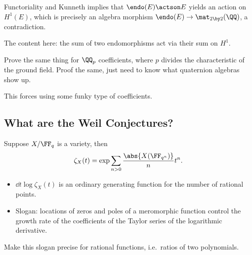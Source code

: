 \begin{exercise}

Functoriality and Kunneth implies that \(\endo(E)\actson E\) yields an
action on \(H^1(E)\), which is precisely an algebra morphism
\(\endo(E) \to \mat_{2\by 2}(\QQ)\), a contradiction.

The content here: the sum of two endomorphisms act via their sum on
\(H^1\).

\end{exercise}

\begin{exercise}

Prove the same thing for \(\QQ_p\) coefficients, where \(p\) divides the
characteristic of the ground field. Proof the same, just need to know
what quaternion algebras show up.

\end{exercise}

This forces using some funky type of coefficients.

\hypertarget{what-are-the-weil-conjectures}{%
\subsection{What are the Weil
Conjectures?}\label{what-are-the-weil-conjectures}}

Suppose \(X/\FF_q\) is a variety, then
\begin{align*}  
\zeta_X(t) = \exp{\sum_{n>0} { {\abs{X(\FF_{q^n})} \over n} t^n } }
.\end{align*}

\begin{remark}

\envlist

\begin{itemize}
\item
  \(\dd{}{t} \log \zeta_X(t)\) is an ordinary generating function for
  the number of rational points.
\item
  Slogan: locations of zeros and poles of a meromorphic function control
  the growth rate of the coefficients of the Taylor series of the
  logarithmic derivative.
\end{itemize}

\end{remark}

\begin{exercise}

Make this slogan precise for rational functions, i.e.~ratios of two
polynomials.

\end{exercise}

